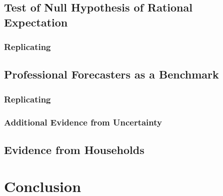 \documentclass[]{article}
\begin{document}
\subsection{Test of Null Hypothesis of Rational Expectation}

\subsubsection{Replicating  \cite{fuhrer2018intrinsic}}

\subsection{Professional Forecasters as a Benchmark}

\subsubsection{Replicating \cite{coibion2012can}}

\subsubsection{Additional Evidence from Uncertainty}

\subsection{Evidence from Households}

\section{Conclusion}




\end{document}
